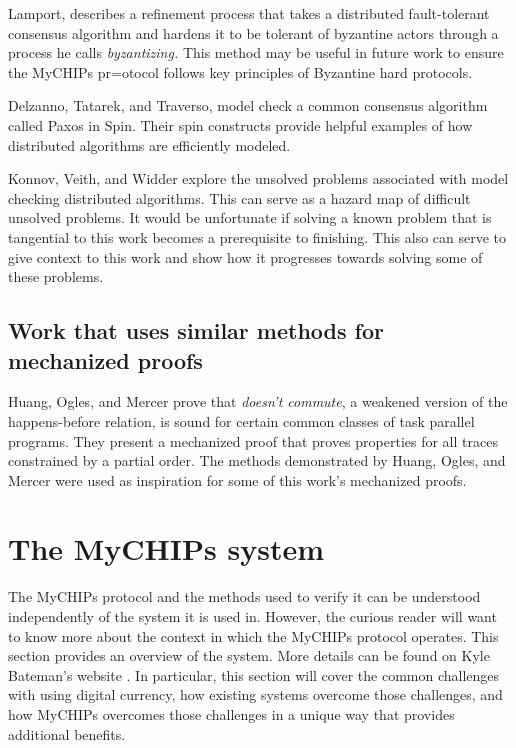\documentclass[runningheads]{llncs}
\begin{document}
 Lamport\cite{Lamport}, describes a refinement process that takes a distributed fault-tolerant consensus algorithm and hardens it to be tolerant of byzantine actors through a process he calls \emph{byzantizing.} This method may be useful in future work to ensure the MyCHIPs pr=otocol follows key principles of Byzantine hard protocols.
 
 Delzanno, Tatarek, and Traverso, model check a common consensus algorithm called Paxos in Spin. Their spin constructs provide helpful examples of how distributed algorithms are efficiently modeled.\cite{Delzanno_2014}
 
 Konnov, Veith, and Widder explore the unsolved problems associated with model checking distributed algorithms. This can serve as a hazard map of difficult unsolved problems. It would be unfortunate if solving a known problem that is tangential to this work becomes a prerequisite to finishing. This also can serve to give context to this work and show how it progresses towards solving some of these problems.\cite{Konnov}

\subsection{Work that uses similar methods for mechanized proofs}
 Huang, Ogles, and Mercer prove that \emph{doesn't commute}, a weakened version of the happens-before relation, is sound for certain common classes of task parallel programs. They present a mechanized proof that proves properties for all traces constrained by a partial order. The methods demonstrated by Huang, Ogles, and Mercer were used as inspiration for some of this work's mechanized proofs. \cite{ben_DC}
 

\appendix

\section{The MyCHIPs system}
\label{apdx:mychips}
The MyCHIPs protocol and the methods used to verify it can be understood independently of the system it is used in. However, the curious reader will want to know more about the context in which the MyCHIPs protocol operates. This section provides an overview of the system. More details can be found on Kyle Bateman's website \cite{bateman_myCHIPs}. 
In particular, this section will cover the common challenges with using digital currency, how existing systems overcome those challenges, and how MyCHIPs overcomes those challenges in a unique way that provides additional benefits. 
\end{document}
